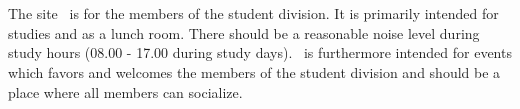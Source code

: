 \documentclass[11pt, includeaddress]{classes/cthit_en}
\begin{document}

\section{\THECLOUD}
The site \THECLOUD\ is for the members of the student division.
It is primarily intended for studies and as a lunch room.
There should be a reasonable noise level during study hours (08.00 - 17.00 during study days).
\THECLOUD\ is furthermore intended for events which favors and welcomes the members of the student division and should be a place where all members can socialize.

\end{document}
